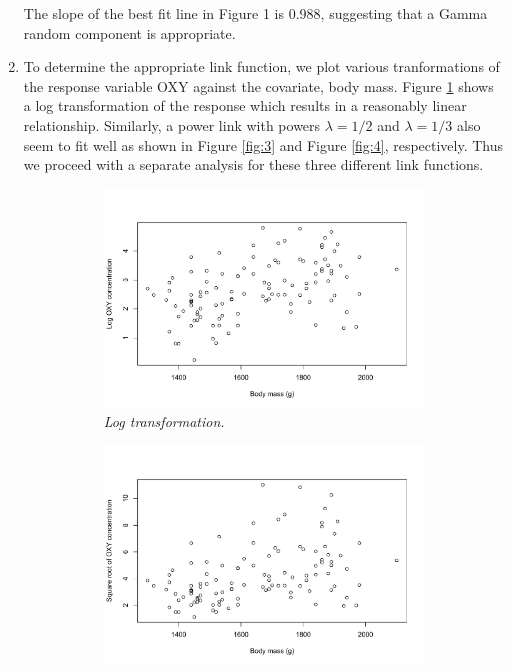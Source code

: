 \documentclass[12pt]{article}
\begin{document}
\begin{enumerate}
    The slope of the best fit line in Figure 1 is 0.988, suggesting that a Gamma random component is appropriate.

  \item To determine the appropriate link function, we plot various tranformations of the response variable OXY against the covariate, body mass.
    Figure \ref{fig:2} shows a log transformation of the response which results in a reasonably linear relationship. Similarly, a power link with
    powers $\lambda = 1/2$ and $\lambda = 1/3$ also seem to fit well as shown in Figure \ref{fig:3} and Figure \ref{fig:4}, respectively.
    Thus we proceed with a separate analysis for these three different link functions.
    
    \begin{figure}[h]
      \centering
      \caption{\emph{Various tranformations of the reponse OXY against the covariate body mass.}}
      \begin{subfigure}{0.6\textwidth}
        \centering
        \includegraphics[width=1\linewidth]{./figures/hw03_log_link.pdf}
        \caption{\emph{Log transformation.}}
        \label{fig:2}
      \end{subfigure}
      \begin{subfigure}{0.4\textwidth}
        \centering
        \includegraphics[width=1\linewidth]{./figures/hw03_sqrt_link.pdf}

\end{subfigure}
\end{figure}
\end{enumerate}
\end{document}
